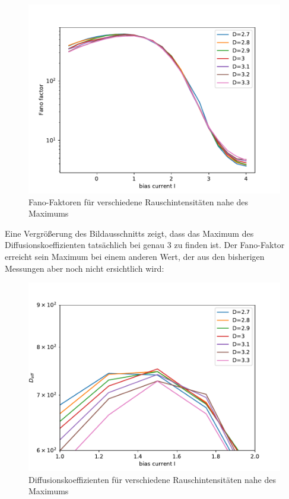 \documentclass[12pt,a4paper]{article}
\begin{document}
\begin{figure}[H]
	\centering
	\includegraphics[scale=0.9]{fneurpmax.pdf} 
	\caption{Fano-Faktoren für verschiedene Rauschintensitäten nahe des Maximums}
	\label{fnpmax}
\end{figure} 
Eine Vergrößerung des Bildausschnitts zeigt, dass das Maximum des Diffusionskoeffizienten tatsächlich bei genau 3 zu finden ist. Der Fano-Faktor erreicht sein Maximum bei einem anderen Wert, der aus den bisherigen Messungen aber noch nicht ersichtlich wird:

\begin{figure}[H]
	\centering
	\includegraphics[scale=0.9]{dneurpmaxclose.pdf} 
	\caption{Diffusionskoeffizienten für verschiedene Rauschintensitäten nahe des Maximums}
	\label{dnpmaxcl}
\end{figure} 
\end{document}
